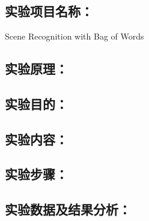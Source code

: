\documentclass[a4paper,11pt,UTF8,AutoFakeBold]{ctexart}
\begin{document}
\xiaosihao {}  

\author{谢卿云}


\chapter{}{}{}           %

\section{实验项目名称：}
Scene Recognition with Bag of Words

\section{实验原理：}


\section{实验目的：}


\section{实验内容：}


% 

\section{实验步骤：}


\section{实验数据及结果分析：}

\end{document}
